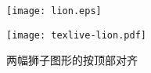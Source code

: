 \begin{figure}
  \centering
  \begin{varwidth}[t]{\textwidth}
    \vspace{0pt}
    \texttt{[image: lion.eps]}
  \end{varwidth}%
  \qquad
  \begin{varwidth}[t]{\textwidth}
    \vspace{0pt}
    \texttt{[image: texlive-lion.pdf]}
  \end{varwidth}
  \caption{两幅狮子图形的按顶部对齐}
\end{figure}

